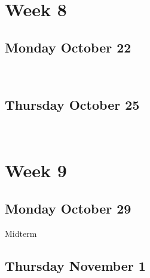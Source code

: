 \documentclass[]{book}
\let\originaltabular\tabular
\let\endoriginaltabular\endtabular
\renewenvironment{tabular}[1]{%
  \begingroup%
  \centering%
  \originaltabular{#1}}%
  {\endoriginaltabular\endgroup}
\theoremstyle{definition}
\theoremstyle{definition}
\theoremstyle{definition}
\theoremstyle{remark}
\begin{document}
\section{Week 8}\label{week-8}

\subsection{Monday October 22}\label{monday-october-22}

\begin{table}[H]
\centering
\begin{tabular}{l}
\hline
\\
\hline
\end{tabular}
\end{table}

\subsection{Thursday October 25}\label{thursday-october-25}

\begin{table}[H]
\centering
\begin{tabular}{l}
\hline
\\
\hline
\end{tabular}
\end{table}

\section{Week 9}\label{week-9}

\subsection{Monday October 29}\label{monday-october-29}

\begin{table}[H]
\centering
\begin{tabular}{l}
\hline
Midterm\\
\hline
\end{tabular}
\end{table}

\subsection{Thursday November 1}\label{thursday-november-1}

\begin{table}[H]
\centering
\begin{tabular}{l}
\hline
\\
\hline
\end{tabular}
\end{table}
\end{document}
